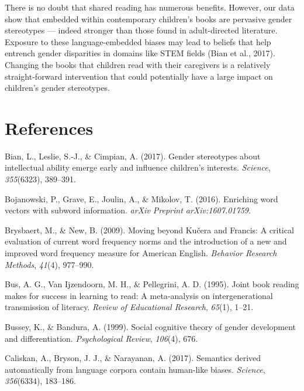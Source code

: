 \documentclass[english,,man,floatsintext]{apa6}
\begin{document}
There is no doubt that shared reading has numerous benefits. However, our data show that embedded within contemporary children's books are pervasive gender stereotypes --- indeed stronger than those found in adult-directed literature. Exposure to these language-embedded biases may lead to beliefs that help entrench gender disparities in domains like STEM fields (Bian et al., 2017). Changing the books that children read with their caregivers is a relatively straight-forward intervention that could potentially have a large impact on children's gender stereotypes.

\newpage

\hypertarget{references}{%
\section{References}\label{references}}

\setlength{\parindent}{-0.5in}
\setlength{\leftskip}{0.5in}

\hypertarget{refs}{}
\leavevmode\hypertarget{ref-bian2017gender}{}%
Bian, L., Leslie, S.-J., \& Cimpian, A. (2017). Gender stereotypes about intellectual ability emerge early and influence children's interests. \emph{Science}, \emph{355}(6323), 389--391.

\leavevmode\hypertarget{ref-bojanowski2016enriching}{}%
Bojanowski, P., Grave, E., Joulin, A., \& Mikolov, T. (2016). Enriching word vectors with subword information. \emph{arXiv Preprint arXiv:1607.01759}.

\leavevmode\hypertarget{ref-brysbaert2009moving}{}%
Brysbaert, M., \& New, B. (2009). Moving beyond Kučera and Francis: A critical evaluation of current word frequency norms and the introduction of a new and improved word frequency measure for American English. \emph{Behavior Research Methods}, \emph{41}(4), 977--990.

\leavevmode\hypertarget{ref-bus1995joint}{}%
Bus, A. G., Van Ijzendoorn, M. H., \& Pellegrini, A. D. (1995). Joint book reading makes for success in learning to read: A meta-analysis on intergenerational transmission of literacy. \emph{Review of Educational Research}, \emph{65}(1), 1--21.

\leavevmode\hypertarget{ref-bussey1999social}{}%
Bussey, K., \& Bandura, A. (1999). Social cognitive theory of gender development and differentiation. \emph{Psychological Review}, \emph{106}(4), 676.

\leavevmode\hypertarget{ref-caliskan2017semantics}{}%
Caliskan, A., Bryson, J. J., \& Narayanan, A. (2017). Semantics derived automatically from language corpora contain human-like biases. \emph{Science}, \emph{356}(6334), 183--186.
\end{document}
